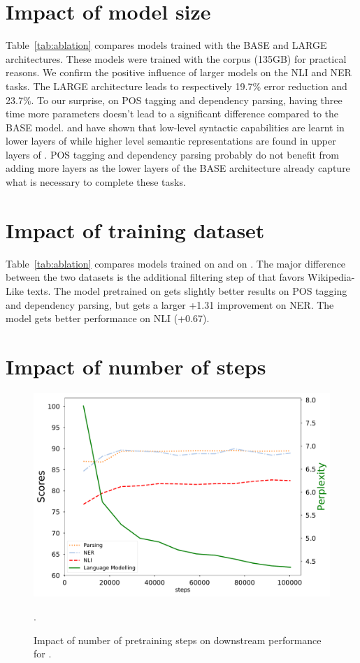 \section{Impact of model size}
Table~\ref{tab:ablation} compares models trained with the BASE and LARGE architectures.
These models were trained with the \ccnet corpus (135GB) for practical reasons.
We confirm the positive influence of larger models on the NLI and NER tasks. The LARGE architecture leads to respectively 19.7\% error reduction and 23.7\%.
To our surprise, on POS tagging and dependency parsing, having three time more parameters doesn't lead to a significant  difference compared to the BASE model.
 and  have shown that low-level syntactic capabilities are learnt in lower layers of \bert while higher level semantic representations are found in upper layers of \bert.
POS tagging and dependency parsing probably do not benefit from adding more layers as the lower layers of the BASE architecture already capture what is necessary to complete these tasks.


\section{Impact of training dataset}

Table~\ref{tab:ablation} compares models trained on \ccnet and on \oscar.
The major difference between the two datasets is the additional filtering step of \ccnet that favors Wikipedia-Like texts.
The model pretrained on \oscar gets slightly better results on POS tagging and dependency parsing, but gets a larger +1.31 improvement on NER.
The \ccnet model gets better performance on NLI (+0.67).

\section{Impact of number of steps}
\label{sec:nbsteps}

\begin{figure}[t]
    \centering
    \includegraphics[width=\linewidth]{static/media/models/camembert/plot_steps_impact_4.pdf}
    \caption{Impact of number of pretraining steps on downstream performance for \camembert.}.
    \label{fig:n_steps_impact}
\end{figure}


